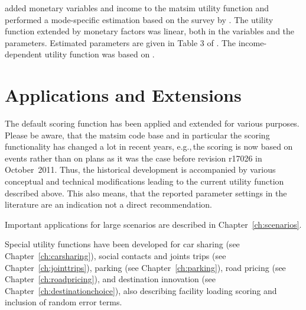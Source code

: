\citet[][]{Kickhoefer_MastersThesis_2009} added monetary variables and income to the \gls{matsim} utility function and performed a mode-specific estimation based on the survey by \citet[][]{VrticEtAl_ResRep_SVI_2007}. The utility function extended by monetary factors was linear, both in the variables and the parameters. Estimated parameters are given in Table 3 of \citet[][]{Kickhoefer_MastersThesis_2009}. The income-dependent utility function was based on \citet[][]{Franklin_PhDThesis_2006}.

%

\section{Applications and Extensions}
\label{sec:appsExtensions}

The default scoring function has been applied and extended for various purposes. Please be aware, that the \gls{matsim} code base and in particular the scoring functionality has changed a lot in recent years, e.g.,\,the scoring is now based on events rather than on plans as it was the case before revision r17026 in October~2011.
Thus, the historical development is accompanied by various conceptual and technical modifications leading to the current utility function described above. This also means, that the reported parameter settings in the literature are an indication not a direct recommendation.

Important applications for large scenarios are described in Chapter~\ref{ch:scenarios}.

Special utility functions have been developed for car sharing (see Chapter~\ref{ch:carsharing}), social contacts and joints trips (see Chapter~\ref{ch:jointtrips}), parking (see Chapter~\ref{ch:parking}), road pricing (see Chapter~\ref{ch:roadpricing}), and destination innovation (see Chapter~\ref{ch:destinationchoice}), also describing facility loading scoring and inclusion of random error terms. 
 

